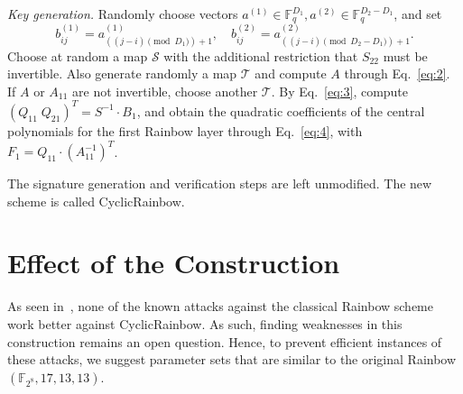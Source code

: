 \documentclass[a4paper, 14pt]{extarticle}
\begin{document}
\emph{Key generation.} Randomly choose vectors $a^{(1)} \in \mathbb{F}_{q}^{D_{1}}, a^{(2)} \in \mathbb{F}_{q}^{D_{2} - D_{1}}$, and set 
\begin{equation}
    b_{ij}^{(1)} = a_{((j - i) \pmod{D_{1}}) + 1}^{(1)}, \quad b_{ij}^{(2)} = a_{((j - i) \pmod{D_{2} - D_{1}}) + 1}^{(2)}.
\end{equation}
Choose at random a map $\mathcal{S}$ with the additional restriction that $S_{22}$ must be invertible. Also generate randomly a map $\mathcal{T}$ and compute $A$ through Eq.~\ref{eq:2}. If $A$ or $A_{11}$ are not invertible, choose another $\mathcal{T}$. By Eq.~\ref{eq:3}, compute $(Q_{11} \; Q_{21})^{T} = S^{-1} \cdot B_{1}$, and obtain the quadratic coefficients of the central polynomials for the first Rainbow layer through Eq.~\ref{eq:4}, with $F_{1} = Q_{11} \cdot (A_{11}^{-1})^{T}$.

The signature generation and verification steps are left unmodified. The new scheme is called CyclicRainbow.

\section{Effect of the Construction}\label{sec:effect}

As seen in~\cite[Section 9.3]{Petzoldt:phd:2013:jul}, none of the known attacks against the classical Rainbow scheme work better against CyclicRainbow. As such, finding weaknesses in this construction remains an open question. Hence, to prevent efficient instances of these attacks, we suggest parameter sets that are similar to the original Rainbow$(\mathbb{F}_{2^{8}}, 17, 13, 13)$.
\end{document}
